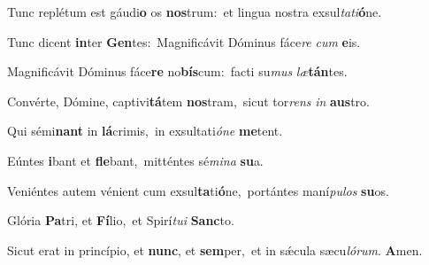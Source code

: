Tunc replétum est gáudi\textbf{o} os \textbf{nos}trum:~\redgreheightstar et lingua nostra exsul\textit{ta}\textit{ti}\textbf{ó}ne.

Tunc dicent \textbf{in}ter \textbf{Gen}tes:~\redgreheightstar Magnificávit Dóminus fáce\textit{re} \textit{cum} \textbf{e}is.

Magnificávit Dóminus fáce\textbf{re} no\textbf{bís}cum:~\redgreheightstar facti su\textit{mus} \textit{læ}\textbf{tán}tes.

Convérte, Dómine, captivi\textbf{tá}tem \textbf{nos}tram,~\redgreheightstar sicut tor\textit{rens} \textit{in} \textbf{aus}tro.

Qui sémi\textbf{nant} in \textbf{lá}crimis,~\redgreheightstar in exsultati\textit{ó}\textit{ne} \textbf{me}tent.

Eúntes \textbf{i}bant et \textbf{fle}bant,~\redgreheightstar mitténtes sé\textit{mi}\textit{na} \textbf{su}a.

Veniéntes autem vénient cum exsul\textbf{ta}ti\textbf{ó}ne,~\redgreheightstar portántes maní\textit{pu}\textit{los} \textbf{su}os.

Glória \textbf{Pa}tri, et \textbf{Fí}lio,~\redgreheightstar et Spirí\textit{tu}\textit{i} \textbf{Sanc}to.

Sicut erat in princípio, et \textbf{nunc}, et \textbf{sem}per,~\redgreheightstar et in sǽcula sæcu\textit{ló}\textit{rum}. \textbf{A}men.

